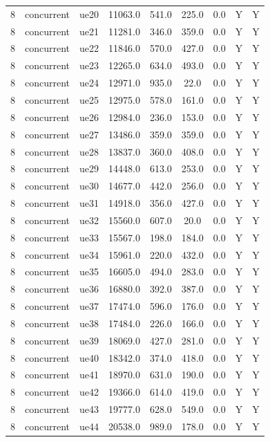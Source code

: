 \begin{table}[ht]
\begin{tabular}{|c|c|c|c|c|c|c|c|c|}
8 & concurrent & ue20 & 11063.0 & 541.0 & 225.0 & 0.0 & Y & Y \\
8 & concurrent & ue21 & 11281.0 & 346.0 & 359.0 & 0.0 & Y & Y \\
8 & concurrent & ue22 & 11846.0 & 570.0 & 427.0 & 0.0 & Y & Y \\
8 & concurrent & ue23 & 12265.0 & 634.0 & 493.0 & 0.0 & Y & Y \\
8 & concurrent & ue24 & 12971.0 & 935.0 & 22.0 & 0.0 & Y & Y \\
8 & concurrent & ue25 & 12975.0 & 578.0 & 161.0 & 0.0 & Y & Y \\
8 & concurrent & ue26 & 12984.0 & 236.0 & 153.0 & 0.0 & Y & Y \\
8 & concurrent & ue27 & 13486.0 & 359.0 & 359.0 & 0.0 & Y & Y \\
8 & concurrent & ue28 & 13837.0 & 360.0 & 408.0 & 0.0 & Y & Y \\
8 & concurrent & ue29 & 14448.0 & 613.0 & 253.0 & 0.0 & Y & Y \\
8 & concurrent & ue30 & 14677.0 & 442.0 & 256.0 & 0.0 & Y & Y \\
8 & concurrent & ue31 & 14918.0 & 356.0 & 427.0 & 0.0 & Y & Y \\
8 & concurrent & ue32 & 15560.0 & 607.0 & 20.0 & 0.0 & Y & Y \\
8 & concurrent & ue33 & 15567.0 & 198.0 & 184.0 & 0.0 & Y & Y \\
8 & concurrent & ue34 & 15961.0 & 220.0 & 432.0 & 0.0 & Y & Y \\
8 & concurrent & ue35 & 16605.0 & 494.0 & 283.0 & 0.0 & Y & Y \\
8 & concurrent & ue36 & 16880.0 & 392.0 & 387.0 & 0.0 & Y & Y \\
8 & concurrent & ue37 & 17474.0 & 596.0 & 176.0 & 0.0 & Y & Y \\
8 & concurrent & ue38 & 17484.0 & 226.0 & 166.0 & 0.0 & Y & Y \\
8 & concurrent & ue39 & 18069.0 & 427.0 & 281.0 & 0.0 & Y & Y \\
8 & concurrent & ue40 & 18342.0 & 374.0 & 418.0 & 0.0 & Y & Y \\
8 & concurrent & ue41 & 18970.0 & 631.0 & 190.0 & 0.0 & Y & Y \\
8 & concurrent & ue42 & 19366.0 & 614.0 & 419.0 & 0.0 & Y & Y \\
8 & concurrent & ue43 & 19777.0 & 628.0 & 549.0 & 0.0 & Y & Y \\
8 & concurrent & ue44 & 20538.0 & 989.0 & 178.0 & 0.0 & Y & Y \\

\end{tabular}
\end{table}
